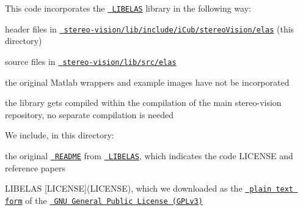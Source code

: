 This code incorporates the \href{http://www.cvlibs.net/software/libelas/}{\texttt{ LIBELAS}} library in the following way\+:
\begin{DoxyItemize}
\item header files in \href{./}{\texttt{ stereo-\/vision/lib/include/i\+Cub/stereo\+Vision/elas}} (this directory)
\item source files in \href{../../../../src/elas}{\texttt{ stereo-\/vision/lib/src/elas}}
\item the original Matlab wrappers and example images have not be incorporated
\item the library gets compiled within the compilation of the main {\ttfamily stereo-\/vision} repository, no separate compilation is needed
\end{DoxyItemize}

We include, in this directory\+:
\begin{DoxyItemize}
\item the original \href{LIBELAS-README.txt}{\texttt{ README}} from \href{http://www.cvlibs.net/software/libelas/}{\texttt{ LIBELAS}}, which indicates the code LICENSE and reference papers
\item LIBELAS \mbox{[}LICENSE\mbox{]}(LICENSE), which we downloaded as the \href{http://www.gnu.org/licenses/gpl-3.0.txt}{\texttt{ plain text form}} of the \href{http://www.gnu.org/licenses/gpl.html}{\texttt{ GNU General Public License (GPLv3)}} 
\end{DoxyItemize}